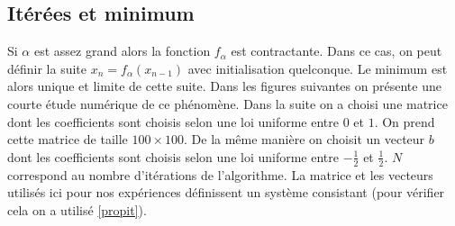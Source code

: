 \documentclass[10pt,a4paper]{article}
\begin{document}
\subsection{Itérées et minimum}
Si $\alpha$ est assez grand alors la fonction $f_{\alpha}$ est contractante.
Dans ce cas, on peut définir la suite $x_n=f_{\alpha}(x_{n-1})$ avec initialisation quelconque.
Le minimum est alors unique et limite de cette suite.
Dans les figures suivantes on présente une courte étude numérique de ce phénomène.
Dans la suite on a choisi une matrice dont les coefficients sont choisis selon une loi uniforme entre $0$ et $1$.
On prend cette matrice de taille $100 \times 100$.
De la même manière on choisit un vecteur $b$ dont les coefficients sont choisis selon une loi uniforme entre $-\frac{1}{2}$ et $\frac{1}{2}$. $N$ correspond au nombre d'itérations de l'algorithme.
La matrice et les vecteurs utilisés ici pour nos expériences définissent un système consistant (pour vérifier cela on a utilisé \ref{propit}).
\end{document}
